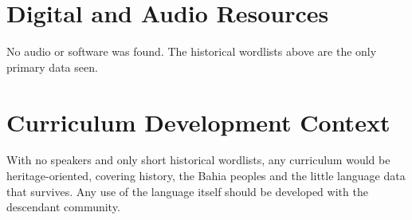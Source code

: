 \documentclass[12pt]{article}
\begin{document}
\section{Digital and Audio Resources}
No audio or software was found. The historical wordlists above are the only primary data seen.
\section{Curriculum Development Context}
With no speakers and only short historical wordlists, any curriculum would be heritage-oriented, covering history, the Bahia peoples and the little language data that survives. Any use of the language itself should be developed with the descendant community.
\end{document}
